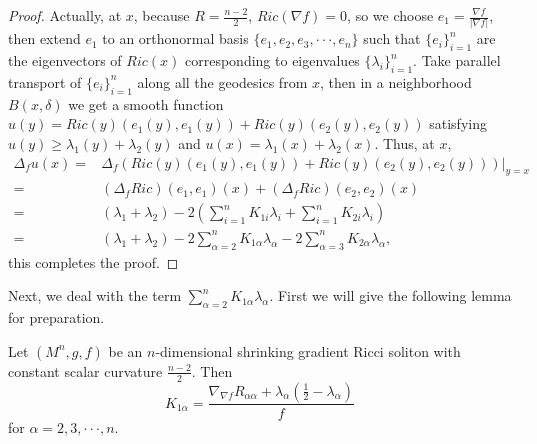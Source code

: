 \documentclass[12pt]{amsart}
\begin{document}
	\begin{proof}
		Actually, at $x$, because $R=\frac{n-2}{2}$, $Ric(\nabla f)=0$, so we choose $e_1=\frac{\nabla f}{|\nabla f|}$, then extend $e_1$ to an orthonormal basis $\{e_1, e_2, e_3,\cdot\cdot\cdot, e_n\}$ such that $\{e_i\}_{i=1}^n$ are the eigenvectors of $Ric(x)$ corresponding to eigenvalues $\{\lambda_i\}_{i=1}^n$. Take parallel transport of $\{e_i\}_{i=1}^n$ along all the geodesics from $x$, then in a neighborhood $B(x, \delta)$ we get a smooth function $u(y)=Ric(y)(e_1(y), e_1(y))+Ric(y)(e_2(y), e_2(y))$ satisfying $u(y)\geq \lambda_1(y)+\lambda_2(y)$ and  $u(x)= \lambda_1(x)+\lambda_2(x)$.
		Thus, at $x$,
	 \begin{equation*}
		\begin{aligned}
			\Delta_f u(x)
			=&\Delta_f\left(Ric(y)(e_1(y), e_1(y))+Ric(y)(e_2(y), e_2(y)) \right)|_{y=x}\\
			=&(\Delta_f Ric)(e_1, e_1)(x)+(\Delta_f Ric)(e_2, e_2)(x)\\
			=&(\lambda_1+\lambda_2)-2(\sum_{i=1}^n K_{1i}\lambda_i +\sum_{i=1}^n K_{2i}\lambda_i)\\
			=&(\lambda_1+\lambda_2)-2\sum_{\alpha=2}^n K_{1\alpha}\lambda_\alpha
			-2\sum_{\alpha=3}^n K_{2\alpha}\lambda_\alpha,
		\end{aligned}
	\end{equation*}
	this completes the proof.
\end{proof}
	
	Next, we deal with the term $\sum_{\alpha=2}^n K_{1\alpha}\lambda_\alpha$. First we will give the following lemma for preparation.
	
	\begin{lem} Let $(M^n, g, f)$ be an $n$-dimensional shrinking gradient Ricci soliton with constant scalar curvature $\frac{n-2}{2}$. Then
		\begin{equation}\label{k1a}
		K_{1\alpha}=\frac{\nabla_{\nabla f}R_{\alpha\alpha} +\lambda_\alpha(\frac{1}{2}-\lambda_\alpha)}{f}
		\end{equation}	
		for $\alpha=2,  3, \cdot\cdot\cdot, n$.	
	\end{lem}
	
\end{document}
